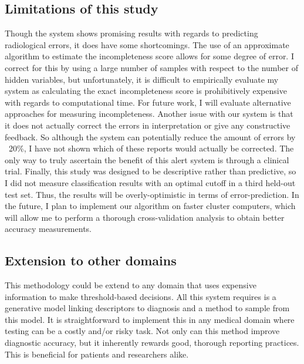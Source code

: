 \subsection{Limitations of this study}
Though the system shows promising results with regards to predicting radiological errors, it does have some shortcomings. The use of an approximate algorithm to estimate the incompleteness score allows for some degree of error. I correct for this by using a large number of samples with respect to the number of hidden variables, but unfortunately, it is difficult to empirically evaluate my system as calculating the exact incompleteness score is prohibitively expensive with regards to computational time. For future work, I will evaluate alternative approaches for measuring incompleteness. Another issue with our system is that it does not actually correct the errors in interpretation or give any constructive feedback. So although the system can potentially reduce the amount of errors by  ~20\%, I have not shown which of these reports would actually be corrected. The only way to truly ascertain the benefit of this alert system is through a clinical trial. Finally, this study was designed to be descriptive rather than predictive, so I did not measure classification results with an optimal cutoff in a third held-out test set. Thus, the results will be overly-optimistic in terms of error-prediction. In the future, I plan to implement our algorithm on faster cluster computers, which will allow me to perform a thorough cross-validation analysis to obtain better accuracy measurements. 

\subsection{Extension to other domains}
This methodology could be extend to any domain that uses expensive information to make threshold-based decisions. All this system requires is a generative model linking descriptors to diagnosis and a method to sample from this model. It is straightforward to implement this in any medical domain where testing can be a costly and/or risky task. Not only can this method improve diagnostic accuracy, but it inherently rewards good, thorough reporting practices. This is beneficial for patients and researchers alike.
